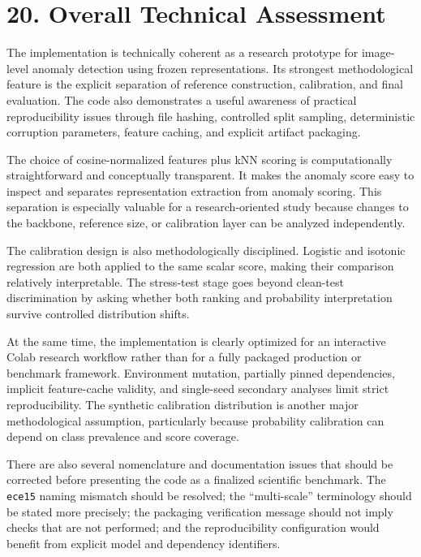 \documentclass[
  11pt,
]{article}
\begin{document}
\section{20. Overall Technical
Assessment}\label{overall-technical-assessment}

The implementation is technically coherent as a research prototype for
image-level anomaly detection using frozen representations. Its
strongest methodological feature is the explicit separation of reference
construction, calibration, and final evaluation. The code also
demonstrates a useful awareness of practical reproducibility issues
through file hashing, controlled split sampling, deterministic
corruption parameters, feature caching, and explicit artifact packaging.

The choice of cosine-normalized features plus kNN scoring is
computationally straightforward and conceptually transparent. It makes
the anomaly score easy to inspect and separates representation
extraction from anomaly scoring. This separation is especially valuable
for a research-oriented study because changes to the backbone, reference
size, or calibration layer can be analyzed independently.

The calibration design is also methodologically disciplined. Logistic
and isotonic regression are both applied to the same scalar score,
making their comparison relatively interpretable. The stress-test stage
goes beyond clean-test discrimination by asking whether both ranking and
probability interpretation survive controlled distribution shifts.

At the same time, the implementation is clearly optimized for an
interactive Colab research workflow rather than for a fully packaged
production or benchmark framework. Environment mutation, partially
pinned dependencies, implicit feature-cache validity, and single-seed
secondary analyses limit strict reproducibility. The synthetic
calibration distribution is another major methodological assumption,
particularly because probability calibration can depend on class
prevalence and score coverage.

There are also several nomenclature and documentation issues that should
be corrected before presenting the code as a finalized scientific
benchmark. The \texttt{ece15} naming mismatch should be resolved; the
``multi-scale'' terminology should be stated more precisely; the
packaging verification message should not imply checks that are not
performed; and the reproducibility configuration would benefit from
explicit model and dependency identifiers.
\end{document}
